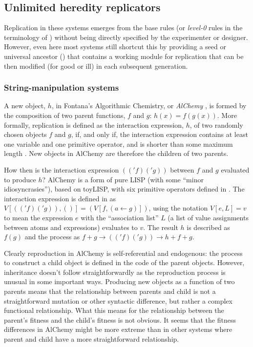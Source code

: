 \subsection{Unlimited heredity replicators}
Replication in these systems emerges from the base rules (or \textit{level-0} rules in the terminology of \textcite{BanzhafBaumgaertnerBeslonEtAl2016}) without being directly specified by the experimenter or designer. However, even here most systems still shortcut this by providing a seed or universal ancestor (\eg \textcite{Ofria2004}) that contains a working module for replication that can be then modified (for good or ill) in each subsequent generation.

\subsubsection{String-manipulation systems}

A new object, $h$, in Fontana's Algorithmic Chemistry, or \emph{AlChemy} \parencite{Fontana1992}, is formed by the composition of two parent functions, $f$ and $g$: $h(x)=f(g(x))$. More formally, replication is defined as the interaction expression, $h$, of two randomly chosen objects $f$ and $g$, if, and only if, the interaction expression contains at least one variable and one primitive operator, and is shorter than some maximum length \parencite[p.173--p.180]{Fontana1992}. New objects in AlChemy are therefore the children of two parents.

How then is the interaction expression $(('f)('g))$ between $f$ and $g$ evaluated to produce $h$? AlChemy is a form of pure LISP (with some ``minor idiosyncrasies''), based on toyLISP, with six primitive operators defined in \textcite[p.205]{Fontana1992}. The interaction expression is defined in \textcite[definition A.9, p.204]{Fontana1992} as $V[(('f)('g)),()] = (V[f,(a\leftarrow g)])$, using the notation $V[e,L]=v$ to mean the expression $e$ with the ``association list'' $L$ (a list of value assignments between atoms and expressions) evaluates to $v$. The result $h$ is described as $f(g)$ and the process as $f+g \rightarrow (('f)('g)) \rightarrow h + f + g$.

Clearly reproduction in AlChemy is self-referential and endogenous: the process to construct a child object is defined in the code of the parent objects. However, inheritance doesn't follow straightforwardly as the reproduction process is unusual in some important ways. Producing new objects as a function of two parents means that the relationship between parents and child is not a straightforward mutation or other syntactic difference, but rather a complex functional relationship. What this means for the relationship between the parent's fitness and the child's fitness is not obvious. It seems that the fitness differences in AlChemy might be more extreme than in other systems where parent and child have a more straightforward relationship.

